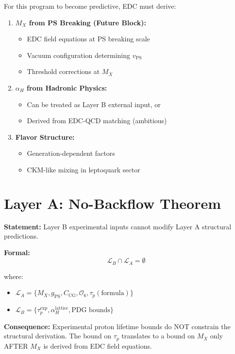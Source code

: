 \documentclass[11pt,a4paper]{article}
\theoremstyle{definition}
\begin{document}
\begin{canonbox}
For this program to become predictive, EDC must derive:

\begin{enumerate}
  \item \textbf{$M_X$ from PS Breaking (Future Block):}
  \begin{itemize}
    \item EDC field equations at PS breaking scale
    \item Vacuum configuration determining $v_{\text{PS}}$
    \item Threshold corrections at $M_X$
  \end{itemize}

  \item \textbf{$\alpha_H$ from Hadronic Physics:}
  \begin{itemize}
    \item Can be treated as Layer B external input, or
    \item Derived from EDC-QCD matching (ambitious)
  \end{itemize}

  \item \textbf{Flavor Structure:}
  \begin{itemize}
    \item Generation-dependent factors
    \item CKM-like mixing in leptoquark sector
  \end{itemize}
\end{enumerate}
\end{canonbox}

\section{Layer A: No-Backflow Theorem}
\label{sec:no-backflow}

\begin{nobackflowbox}
\textbf{Statement:} Layer B experimental inputs cannot modify Layer A structural predictions.

\textbf{Formal:}
\begin{equation}
\label{eq:no-backflow}
\boxed{\mathcal{L}_B \cap \mathcal{L}_A = \emptyset}
\end{equation}

where:
\begin{itemize}
  \item $\mathcal{L}_A = \{M_X, g_{\text{PS}}, C_{\text{CG}}, \mathcal{O}_6, \tau_p(\text{formula})\}$
  \item $\mathcal{L}_B = \{\tau_p^{\text{exp}}, \alpha_H^{\text{lattice}}, \text{PDG bounds}\}$
\end{itemize}

\textbf{Consequence:}
Experimental proton lifetime bounds do NOT constrain the structural derivation.
The bound on $\tau_p$ translates to a bound on $M_X$ only AFTER $M_X$ is derived
from EDC field equations.
\end{nobackflowbox}
\end{document}
